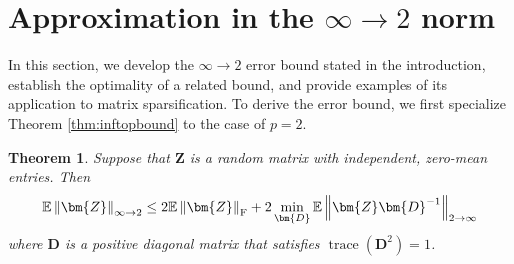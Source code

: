 \documentclass[11pt,letterpaper,twoside,reqno]{amsart}
\newcommand{\mat}[1]{\ensuremath{\bm{#1}}}
\newcommand{\E}{\ensuremath{\mathbb{E}}}
\newcommand{\norm}[1]{\ensuremath{\left\|#1\right\|}}
\newcommand{\inftnorm}[1]{\ensuremath{\left\|#1\right\|_{\infty\rightarrow 2}}}
\newcommand{\inftwo}{\ensuremath{\infty\!\rightarrow\!\!2}}
\newcommand{\frobnorm}[1]{\ensuremath{\left\|#1\right\|_{\text{\rm F}}}}
\DeclareMathOperator{\trace}{trace}
\newtheorem{thm}{Theorem}
\begin{document}
\section{Approximation in the $\inftwo$ norm}

\label{sec:inf2norm}

In this section, we develop the $\inftwo$ error bound stated in the introduction, establish the optimality of a related bound, and provide examples of its application to matrix sparsification. To derive the error bound, we first specialize Theorem \ref{thm:inftopbound} to the case of $p=2$.

\begin{thm}
Suppose that $\mat{Z}$ is a random matrix with independent, zero-mean entries. Then 
\[
\E\inftnorm{\mat{Z}}\leq2\E\frobnorm{\mat{Z}}+2\min_{\mat{D}}\E\norm{\mat{Z}\mat{D}^{-1}}_{2\rightarrow\infty}
\]
where $\mat{D}$ is a positive diagonal matrix that satisfies $\trace(\mat{D}^{2})=1$.
\label{thm:inf2errbound}
\end{thm}
\end{document}
